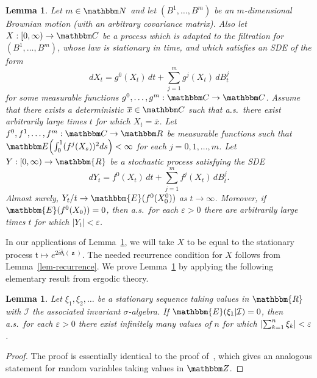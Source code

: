 \documentclass[11pt]{article}
\theoremstyle{plain}
\newtheorem{lem}[thm]{Lemma}
\theoremstyle{definition}
\numberwithin{equation}{section}
\newcommand{\eqbn}{\begin{equation*}}
\newcommand{\eqen}{\end{equation*}}
\newcommand{\BB}{\mathbbm}
\newcommand{\ol}{\overline}
\newcommand{\op}{\operatorname}
\newcommand{\ep}{\varepsilon}
\newcommand{\rta}{\rightarrow}
\newcommand{\wh}{\widehat}
\newcommand{\mcl}{\mathcal}
\newcommand{\zz}{{\op{\mathbf{z}}}}
\newcommand{\tz}{{\mathfrak t}}
\let\originalleft\left
\let\originalright\right
\renewcommand{\left}{\mathopen{}\mathclose\bgroup\originalleft}
\renewcommand{\right}{\aftergroup\egroup\originalright}
\begin{document}
\begin{lem}
\label{lem-stationary-sde}
Let $m\in\BB N$ and let $(B^1,\dots,B^m)$ be an $m$-dimensional Brownian motion (with an arbitrary covariance matrix). 
Also let $X : [0,\infty) \rta \BB C $ be a process which is adapted to the filtration for $(B^1,\dots,B^m)$, whose law is stationary in time, and which satisfies an SDE of the form
\eqbn
dX_t = g^0(X_t)\,dt + \sum_{j=1}^m g^j(X_t) \,dB_t^j 
\eqen 
for some measurable functions $g^0,\dots,g^m : \BB C\to\BB C$.  
Assume that there exists a deterministic $\ol x \in\BB C $ such that a.s.\ there exist arbitrarily large times $t$ for which $X_t =  \ol x $.
Let $f^0, f^1,\dots,f^m : \BB C\rta\BB R$ be measurable functions such that $\BB E\left( \int_0^1 (f^j(X_s ))^2 ds \right) < \infty$ for each $j=0,1,\dots,m$. 
Let $Y:[0,\infty) \rta \BB{R}$ be a stochastic process satisfying the SDE 
\[
dY_t = f^0(X_t ) \, dt + \sum_{j=1}^m f^j(X_t ) \, dB_t^j .
\] 
Almost surely, $Y_t/t \rta  \BB{E}(f^0(X_0^0))$ as $t \rta \infty$.
Moreover, if $\BB{E}(f^0(X_0 )) = 0$, then a.s.\ for each $\ep> 0$ there are arbitrarily large times $t$ for which $|Y_t  |  < \ep$.
\end{lem}

In our applications of Lemma~\ref{lem-stationary-sde}, we will take $X$ to be equal to the stationary process $\tz \mapsto e^{2 i\wh\theta_{\tz}(\zz)}$. The needed recurrence condition for $X$ follows from Lemma~\ref{lem-recurrence}. 
We prove Lemma~\ref{lem-stationary-sde} by applying the following elementary result from ergodic theory.


\begin{lem}
\label{lem-recurrent}
Let $\xi_1,\xi_2,\ldots$ be a stationary sequence taking values in $\BB{R}$ with $\mcl I$ the associated invariant $\sigma$-algebra. If $\BB{E}(\xi_1|\mcl I) = 0$, then a.s.\ for each $\ep > 0$ there exist infinitely many values of $n$ for which $\left| \sum_{k=1}^n \xi_k   \right|  <\ep$.
\end{lem}

\begin{proof}
The proof is essentially identical to the proof of~\cite[Theorem 7.3.2]{durrett}, which gives an analogous statement for random variables taking values in $\BB Z$.
\end{proof}
 
\end{document}
